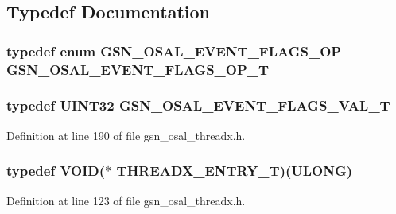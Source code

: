 \subsection{Typedef Documentation}
\hypertarget{a00536_a3782687de549490574b44f3374fb5731}{
\subsubsection[{GSN\_\-OSAL\_\-EVENT\_\-FLAGS\_\-OP\_\-T}]{\setlength{\rightskip}{0pt plus 5cm}typedef enum {\bf GSN\_\-OSAL\_\-EVENT\_\-FLAGS\_\-OP}  {\bf GSN\_\-OSAL\_\-EVENT\_\-FLAGS\_\-OP\_\-T}}}
\label{a00536_a3782687de549490574b44f3374fb5731}
\hypertarget{a00536_afb39f905ce07232becc42deeccb9ad4c}{
\subsubsection[{GSN\_\-OSAL\_\-EVENT\_\-FLAGS\_\-VAL\_\-T}]{\setlength{\rightskip}{0pt plus 5cm}typedef {\bf UINT32} {\bf GSN\_\-OSAL\_\-EVENT\_\-FLAGS\_\-VAL\_\-T}}}
\label{a00536_afb39f905ce07232becc42deeccb9ad4c}


Definition at line 190 of file gsn\_\-osal\_\-threadx.h.

\hypertarget{a00536_acbde002f87f78d02906adef40c5b6f42}{
\subsubsection[{THREADX\_\-ENTRY\_\-T}]{\setlength{\rightskip}{0pt plus 5cm}typedef VOID($\ast$ {\bf THREADX\_\-ENTRY\_\-T})(ULONG)}}
\label{a00536_acbde002f87f78d02906adef40c5b6f42}


Definition at line 123 of file gsn\_\-osal\_\-threadx.h.



